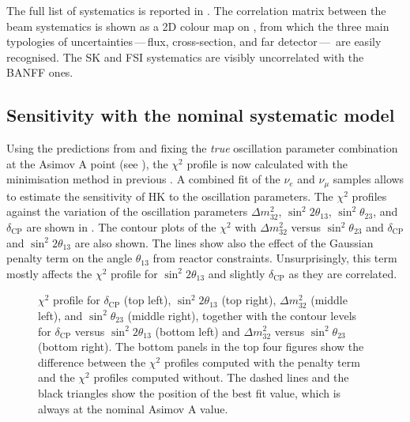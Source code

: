 The full list of systematics is reported in .
The correlation matrix between the beam systematics is shown as a 2D colour map on , %
from which the three main typologies of uncertainties\,---\,flux, cross-section, and far detector\,---\,%
are easily recognised.
The SK and FSI systematics are visibly uncorrelated with the BANFF ones.



\subsection{Sensitivity with the nominal systematic model}
\label{sec:nominal}

Using the predictions from  and fixing the \emph{true} oscillation parameter %
combination at the Asimov A point (see ), %
the $\chi^2$ profile is now calculated with the minimisation method in previous .
A combined fit of the $\nu_e$ and $\nu_\mu$ samples allows to estimate the sensitivity of HK %
to the oscillation parameters.
The $\chi^2$ profiles against the variation of the oscillation parameters %
$\Delta m^2_{32}$, $\sin^2 2\theta_{13}$, $\sin^2 \theta_{23}$, and $\delta_\text{CP}$ %
are shown in .
The contour plots of the $\chi^2$ with $\Delta m_{32}^2$ versus $\sin^2\theta_{23}$ and %
$\delta_\text{CP}$ and $\sin^2 2\theta_{13}$ are also shown.
The lines show also the effect of the Gaussian penalty term on the angle $\theta_{13}$ from reactor constraints.
Unsurprisingly, this term mostly affects the $\chi^2$ profile for $\sin^2 2\theta_{13}$ and slightly $\delta_\text{CP}$ %
as they are correlated.

\begin{figure}
	\centering
	\resizebox{0.49\linewidth}{!}{}
	\resizebox{0.49\linewidth}{!}{}
	\resizebox{0.49\linewidth}{!}{}
	\resizebox{0.49\linewidth}{!}{}
	\resizebox{0.49\linewidth}{!}{}	%
	\resizebox{0.49\linewidth}{!}{}	%
	\caption[$\chi^2$ profiles for $\Delta m_{32}^2$, $\sin^2 2\theta_{13}$, and $\sin\theta_{23}$ with the nominal systematic model]%
		{$\chi^2$ profile for $\delta_\text{CP}$ (top left), $\sin^2 2\theta_{13}$ (top right), %
		$\Delta m_{32}^2$ (middle left), and $\sin^2 \theta_{23}$ (middle right), %
		together with the contour levels for $\delta_\text{CP}$ versus $\sin^2 2\theta_{13}$ (bottom left) %
		and $\Delta m_{32}^2$ versus $\sin^2 \theta_{23}$ (bottom right).
		The bottom panels in the top four figures show the difference between the $\chi^2$ profiles computed %
		with the penalty term and the $\chi^2$ profiles computed without.
		The dashed lines and the black triangles show the position of the best fit value, %
		which is always at the nominal Asimov A value.}
	\label{fig:nominal_profile}
\end{figure}


